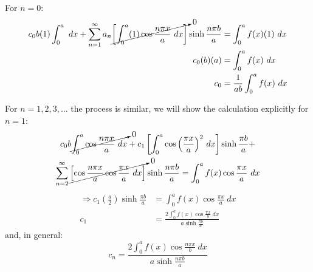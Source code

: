 \vspace{0.25cm}

\noindent For $n=0$:
\begin{align*}
c_0 b (1) \int_{0}^{a} \ dx + \sum\limits_{n=1}^{\infty} a_n \cancelto{0}{\left[\int_0^a (1)\cos{\frac{n \pi x}{a}} \ dx \right]} \sinh{\frac{n \pi b}{a}} &= \int_{0}^a f(x)(1) \ dx \\
c_0 (b) (a) &= \int_0^a f(x) \ dx \\
c_0 &= \frac{1}{ab}\int_0^a f(x) \ dx
\end{align*}

\vspace{0.25cm}

\noindent For $n=1,2,3,\dots$ the process is similar, we will show the calculation explicitly for $n=1$:
\begin{multline*}
c_0b\cancelto{0}{\int_{0}^{a} \cos{\frac{n \pi x}{a}} \ dx} + c_1\left[\int_0^a \cos{\left(\frac{\pi x}{a}\right)}^2 \ dx \right]\sinh{\frac{\pi b}{a}} + \\ \sum\limits_{n=2}^{\infty} \cancelto{0}{\left[\cos{\frac{n \pi x}{a}}\cos{\frac{ \pi x}{a}} \ dx \right]}\sinh{\frac{n \pi b}{a}} = \int_0^a f(x) \cos{\frac{\pi x}{a}} \ dx 
\end{multline*}
\begin{align*}
\Rightarrow c_1 \left(\frac{a}{2} \right)\sinh{\frac{\pi b}{a}} &= \int_0^a f(x) \cos{\frac{\pi x}{a}} \ dx \\
c_1 &= \frac{2\int_0^a f(x) \cos{\frac{\pi x}{b}} \ dx}{a \sinh{\frac{\pi b}{a}}}
\end{align*}
and, in general:
\begin{equation*}
c_n = \frac{2\int_0^a f(x) \cos{\frac{n \pi x}{b}} \ dx}{a \sinh{\frac{n \pi b}{a}}}
\end{equation*}

